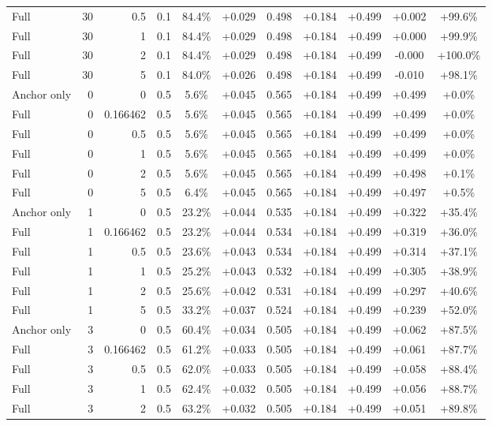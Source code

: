 \begin{table}[htbp]
\begin{tabular}{lrrrccccccc}
Full & 30 & 0.5 & 0.1 & 84.4\% & +0.029 & 0.498 & +0.184 & +0.499 & +0.002 & +99.6\% \\
Full & 30 & 1 & 0.1 & 84.4\% & +0.029 & 0.498 & +0.184 & +0.499 & +0.000 & +99.9\% \\
Full & 30 & 2 & 0.1 & 84.4\% & +0.029 & 0.498 & +0.184 & +0.499 & -0.000 & +100.0\% \\
Full & 30 & 5 & 0.1 & 84.0\% & +0.026 & 0.498 & +0.184 & +0.499 & -0.010 & +98.1\% \\
Anchor only & 0 & 0 & 0.5 & 5.6\% & +0.045 & 0.565 & +0.184 & +0.499 & +0.499 & +0.0\% \\
Full & 0 & 0.166462 & 0.5 & 5.6\% & +0.045 & 0.565 & +0.184 & +0.499 & +0.499 & +0.0\% \\
Full & 0 & 0.5 & 0.5 & 5.6\% & +0.045 & 0.565 & +0.184 & +0.499 & +0.499 & +0.0\% \\
Full & 0 & 1 & 0.5 & 5.6\% & +0.045 & 0.565 & +0.184 & +0.499 & +0.499 & +0.0\% \\
Full & 0 & 2 & 0.5 & 5.6\% & +0.045 & 0.565 & +0.184 & +0.499 & +0.498 & +0.1\% \\
Full & 0 & 5 & 0.5 & 6.4\% & +0.045 & 0.565 & +0.184 & +0.499 & +0.497 & +0.5\% \\
Anchor only & 1 & 0 & 0.5 & 23.2\% & +0.044 & 0.535 & +0.184 & +0.499 & +0.322 & +35.4\% \\
Full & 1 & 0.166462 & 0.5 & 23.2\% & +0.044 & 0.534 & +0.184 & +0.499 & +0.319 & +36.0\% \\
Full & 1 & 0.5 & 0.5 & 23.6\% & +0.043 & 0.534 & +0.184 & +0.499 & +0.314 & +37.1\% \\
Full & 1 & 1 & 0.5 & 25.2\% & +0.043 & 0.532 & +0.184 & +0.499 & +0.305 & +38.9\% \\
Full & 1 & 2 & 0.5 & 25.6\% & +0.042 & 0.531 & +0.184 & +0.499 & +0.297 & +40.6\% \\
Full & 1 & 5 & 0.5 & 33.2\% & +0.037 & 0.524 & +0.184 & +0.499 & +0.239 & +52.0\% \\
Anchor only & 3 & 0 & 0.5 & 60.4\% & +0.034 & 0.505 & +0.184 & +0.499 & +0.062 & +87.5\% \\
Full & 3 & 0.166462 & 0.5 & 61.2\% & +0.033 & 0.505 & +0.184 & +0.499 & +0.061 & +87.7\% \\
Full & 3 & 0.5 & 0.5 & 62.0\% & +0.033 & 0.505 & +0.184 & +0.499 & +0.058 & +88.4\% \\
Full & 3 & 1 & 0.5 & 62.4\% & +0.032 & 0.505 & +0.184 & +0.499 & +0.056 & +88.7\% \\
Full & 3 & 2 & 0.5 & 63.2\% & +0.032 & 0.505 & +0.184 & +0.499 & +0.051 & +89.8\% \\

\end{tabular}
\end{table}

